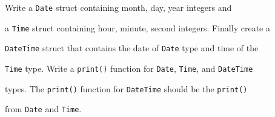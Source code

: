 Write a \texttt{Date} struct containing month, day, year integers and

a \texttt{Time} struct containing hour, minute, second integers. Finally create a

\texttt{DateTime} struct that contains the date of \texttt{Date} type and time of the

\texttt{Time} type. Write a \texttt{print()} function for \texttt{Date}, \texttt{Time}, and \texttt{DateTime}

types. The \texttt{print()} function for \texttt{DateTime} should be the \texttt{print()}

from \texttt{Date} and \texttt{Time}.

